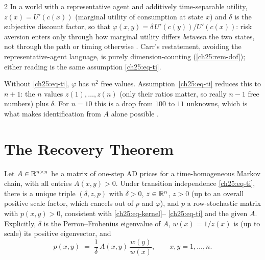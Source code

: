 \begin{paracol}{2}
In a world with a representative agent and additively time-separable utility, $z(x)=U'(c(x))$ (marginal
utility of consumption at state $x$) and $\delta$ is the subjective discount factor, so that
$\varphi(x,y)=\delta\,U'(c(y))/U'(c(x))$: risk aversion enters only through how marginal utility differs
\emph{between} the two states, not through the path or timing otherwise . Carr's
restatement, avoiding the representative-agent language, is purely dimension-counting
(\cref{ch25:rem-dof}); either reading is the same assumption \eqref{ch25:eq-ti}.

\begin{remark}\label{ch25:rem-dof}
Without \eqref{ch25:eq-ti}, $\varphi$ has $n^2$ free values. Assumption~\eqref{ch25:eq-ti} reduces this to
$n+1$: the $n$ values $z(1),\dots,z(n)$ (only their ratios matter, so really $n-1$ free numbers) plus
$\delta$. For $n=10$ this is a drop from $100$ to $11$ unknowns, which is what makes identification from
$A$ alone possible .
\end{remark}

\section{The Recovery Theorem}\label{ch25:sec-thm}

\begin{theorem}\label{ch25:thm-ross}
Let $A\in\mathbb{R}^{n\times n}$ be a matrix of one-step AD prices for a time-homogeneous Markov chain, with all
entries $A(x,y)>0$. Under transition independence \eqref{ch25:eq-ti}, there is a unique triple $(\delta,z,p)$
with $\delta>0$, $z\in\mathbb{R}^n$, $z>0$ (up to an overall positive scale factor, which cancels out of $p$ and
$\varphi$), and $p$ a row-stochastic matrix with $p(x,y)>0$, consistent with \eqref{ch25:eq-kernel}--%
\eqref{ch25:eq-ti} and the given $A$. Explicitly, $\delta$ is the Perron--Frobenius eigenvalue of $A$,
$w(x)=1/z(x)$ is (up to scale) its positive eigenvector, and
\begin{equation}\label{ch25:eq-precover}
  p(x,y) \;=\; \frac{1}{\delta}\,A(x,y)\,\frac{w(y)}{w(x)}, \qquad x,y=1,\dots,n.
\end{equation}
\end{theorem}


\end{paracol}
